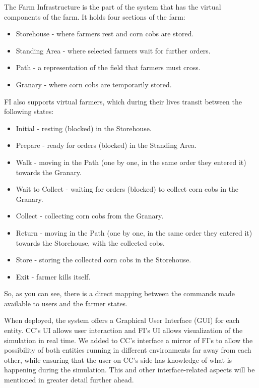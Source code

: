 \documentclass[12pt]{article}
\begin{document}
The Farm Infrastructure is the part of the system that has the virtual components of the farm.
It holds four sections of the farm:
\vspace{-10pt}
\begin{itemize}[noitemsep]
  \item Storehouse - where farmers rest and corn cobs are stored.
  \item Standing Area - where selected farmers wait for further orders.
  \item Path - a representation of the field that farmers must cross.
  \item Granary - where corn cobs are temporarily stored.
\end{itemize}
\vspace{-10pt}
FI also supports virtual farmers, which during their lives transit between the following states:
\vspace{-10pt}
\begin{itemize}[noitemsep]
  \item Initial - resting (blocked) in the Storehouse.
  \item Prepare - ready for orders (blocked) in the Standing Area.
  \item Walk - moving in the Path (one by one, in the same order they entered it) towards the Granary.
  \item Wait to Collect - waiting for orders (blocked) to collect corn cobs in the Granary.
  \item Collect - collecting corn cobs from the Granary.
  \item Return - moving in the Path (one by one, in the same order they entered it) towards the Storehouse, with the collected cobs.
  \item Store - storing the collected corn cobs in the Storehouse.
  \item Exit - farmer kills itself.
\end{itemize}
\vspace{-10pt}
So, as you can see, there is a direct mapping between the commands made available to users and the farmer states.
\newline 

When deployed, the system offers a Graphical User Interface (GUI) for each entity.
CC's UI allows user interaction and FI's UI allows visualization of the simulation in real time.
We added to CC's interface a mirror of FI's to allow the possibility of both entities running in different environments far away from each other, while ensuring 
that the user on CC's side has knowledge of what is happening during the simulation.
This and other interface-related aspects will be mentioned in greater detail further ahead.
\end{document}
